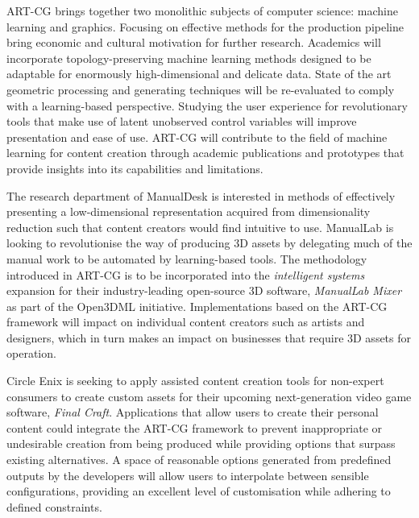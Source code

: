 \documentclass[a4paper, 11pt, onecolumn]{article} %
\numberwithin{equation}{section} %
\numberwithin{figure}{section} %
\numberwithin{table}{section} %
\begin{document}
ART-CG brings together two monolithic subjects of computer science: machine learning and graphics. Focusing on effective methods for the production pipeline bring economic and cultural motivation for further research. Academics will incorporate topology-preserving machine learning methods designed to be adaptable for enormously high-dimensional and delicate data. State of the art geometric processing and generating techniques will be re-evaluated to comply with a learning-based perspective. Studying the user experience for revolutionary tools that make use of latent unobserved control variables will improve presentation and ease of use. ART-CG will contribute to the field of machine learning for content creation through academic publications and prototypes that provide insights into its capabilities and limitations.

The research department of ManualDesk is interested in methods of effectively presenting a low-dimensional representation acquired from dimensionality reduction such that content creators would find intuitive to use.
ManualLab is looking to revolutionise the way of producing 3D assets by delegating much of the manual work to be automated by learning-based tools. The methodology introduced in ART-CG is to be incorporated into the \textit{intelligent systems} expansion for their industry-leading open-source 3D software, \textit{ManualLab Mixer} as part of the Open3DML initiative. Implementations based on the ART-CG framework will impact on individual content creators such as artists and designers, which in turn makes an impact on businesses that require 3D assets for operation.


Circle Enix is seeking to apply assisted content creation tools for non-expert consumers to create custom assets for their upcoming next-generation video game software, \textit{Final Craft}. Applications that allow users to create their personal content could integrate the ART-CG framework to prevent inappropriate or undesirable creation from being produced while providing options that surpass existing alternatives. A space of reasonable options generated from predefined outputs by the developers will allow users to interpolate between sensible configurations, providing an excellent level of customisation while adhering to defined constraints. 
\end{document}
